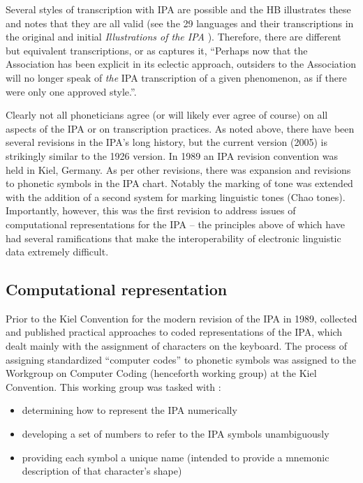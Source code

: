 Several styles of transcription with IPA are possible and the HB illustrates 
these and notes that they are all valid (see the 29 languages and their transcriptions 
in the original and initial \textit{Illustrations of the IPA} \citep[41--154]{IPA2007}). 
Therefore, there are different but equivalent transcriptions, or as \cite[64]{Ladefoged1990a} 
captures it, ``Perhaps now that the Association has been explicit in its eclectic 
approach, outsiders to the Association will no longer speak of \textit{the} IPA 
transcription of a given phenomenon, as if there were only one approved style.''.

Clearly not all phoneticians agree (or will likely ever agree of course) on all 
aspects of the IPA or on transcription practices. As noted above, there have 
been several revisions in the IPA's long history, but the current version (2005) 
is strikingly similar to the 1926 version. In 1989 an IPA revision convention 
was held in Kiel, Germany. As per other revisions, there was expansion and revisions 
to phonetic symbols in the IPA chart. Notably the marking of tone was extended 
with the addition of a second system for marking linguistic tones (Chao tones). 
Importantly, however, this was the first revision to address issues of 
computational representations for the IPA -- the principles above of which 
have had several ramifications that make the interoperability of electronic 
linguistic data extremely difficult.


\subsection{Computational representation}

Prior to the Kiel Convention for the modern revision of the IPA in 1989, 
\cite{Wells1987} collected and published practical approaches to coded 
representations of the IPA, which dealt mainly with the assignment of 
characters on the keyboard. The process of assigning standardized ``computer 
codes'' to phonetic symbols was assigned to the Workgroup on Computer 
Coding (henceforth working group) at the Kiel Convention. This working 
group was tasked with \citep{Esling1990,EslingGaylord1993}: 

\begin{itemize}
	\item determining how to represent the IPA numerically
	\item developing a set of numbers to refer to the IPA symbols unambiguously
	\item providing each symbol a unique name (intended to provide a mnemonic description of that character's shape)
\end{itemize}

